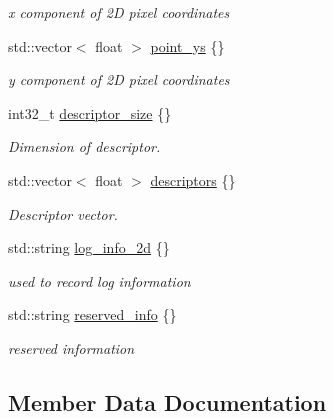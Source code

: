 \begin{DoxyCompactItemize}
\begin{DoxyCompactList}\small\item\em x component of 2D pixel coordinates \end{DoxyCompactList}\item 
std\+::vector$<$ float $>$ \hyperlink{structmaf__perception__interface_1_1FeaturePointArray_aa2ab3d6d3f464861254f53f09e5ed486}{point\+\_\+ys} \{\}
\begin{DoxyCompactList}\small\item\em y component of 2D pixel coordinates \end{DoxyCompactList}\item 
int32\+\_\+t \hyperlink{structmaf__perception__interface_1_1FeaturePointArray_a513f064fcb9555d169c8c2507149d9a7}{descriptor\+\_\+size} \{\}
\begin{DoxyCompactList}\small\item\em Dimension of descriptor. \end{DoxyCompactList}\item 
std\+::vector$<$ float $>$ \hyperlink{structmaf__perception__interface_1_1FeaturePointArray_a689dde20900776d299cad56f822a56ad}{descriptors} \{\}
\begin{DoxyCompactList}\small\item\em Descriptor vector. \end{DoxyCompactList}\item 
std\+::string \hyperlink{structmaf__perception__interface_1_1FeaturePointArray_a14872ef34f155ad1b88c6ab8e73b3593}{log\+\_\+info\+\_\+2d} \{\}
\begin{DoxyCompactList}\small\item\em used to record log information \end{DoxyCompactList}\item 
std\+::string \hyperlink{structmaf__perception__interface_1_1FeaturePointArray_adf7c66106f22edc027babe314b65ec58}{reserved\+\_\+info} \{\}
\begin{DoxyCompactList}\small\item\em reserved information \end{DoxyCompactList}\end{DoxyCompactItemize}


\subsection{Member Data Documentation}
\mbox{\label{structmaf__perception__interface_1_1FeaturePointArray_ac1e6f64b23956e4cb567312f4bf3b599}} 
